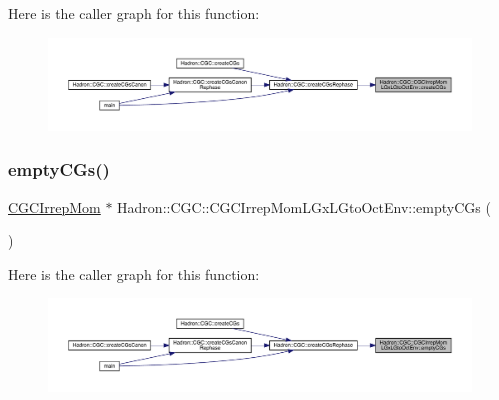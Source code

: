 Here is the caller graph for this function\+:
\nopagebreak
\begin{figure}[H]
\begin{center}
\leavevmode
\includegraphics[width=350pt]{d1/d0f/namespaceHadron_1_1CGC_1_1CGCIrrepMomLGxLGtoOctEnv_a326be3440106df05ce61c23e713f7312_icgraph}
\end{center}
\end{figure}
\mbox{\label{namespaceHadron_1_1CGC_1_1CGCIrrepMomLGxLGtoOctEnv_afd66508df18d3aba9ecfc7d3ad09e448}} 
\subsubsection{\texorpdfstring{emptyCGs()}{emptyCGs()}}
{\footnotesize\ttfamily \mbox{\hyperlink{classHadron_1_1CGCIrrepMom}{C\+G\+C\+Irrep\+Mom}} $\ast$ Hadron\+::\+C\+G\+C\+::\+C\+G\+C\+Irrep\+Mom\+L\+Gx\+L\+Gto\+Oct\+Env\+::empty\+C\+Gs (\begin{DoxyParamCaption}{ }\end{DoxyParamCaption})}

Here is the caller graph for this function\+:
\nopagebreak
\begin{figure}[H]
\begin{center}
\leavevmode
\includegraphics[width=350pt]{d1/d0f/namespaceHadron_1_1CGC_1_1CGCIrrepMomLGxLGtoOctEnv_afd66508df18d3aba9ecfc7d3ad09e448_icgraph}
\end{center}
\end{figure}
